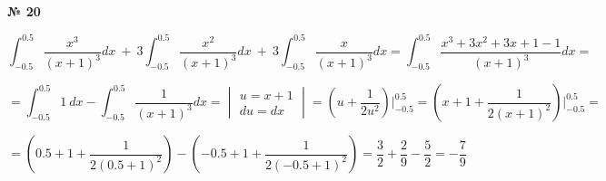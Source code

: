 \documentclass{article}
\begin{document}
\textbf{№ 20} 
\large

$$ \int_{-0.5}^{0.5} \frac{x^3}{(x+1)^3}dx \ + \ 3 \int_{-0.5}^{0.5} \frac{x^2}{(x+1)^3}dx \ + \ 3 \int_{-0.5}^{0.5} \frac{x}{(x+1)^3}dx
= \int_{-0.5}^{0.5} \frac{x^3+3x^2+3x+1-1}{(x+1)^3}dx
= $$

$$ = \int_{-0.5}^{0.5} 1 \ dx - \int_{-0.5}^{0.5} \frac{1}{(x+1)^3} dx
= \begin{vmatrix} u = x+1 \\
                 du = dx \end{vmatrix}
= \left( u + \frac{1}{2u^2} \right) \bigg\vert_{-0.5}^{0.5}
= \left( x+1 + \frac{1}{2(x+1)^2} \right) \bigg\vert_{-0.5}^{0.5}
= $$

$$ = \left( 0.5 + 1 + \frac{1}{2(0.5+1)^2} \right) - \left( -0.5 + 1 + \frac{1}{2(-0.5+1)^2} \right)
= \frac{3}{2} + \frac{2}{9} - \frac{5}{2}
= -\frac{7}{9}$$
\end{document}
